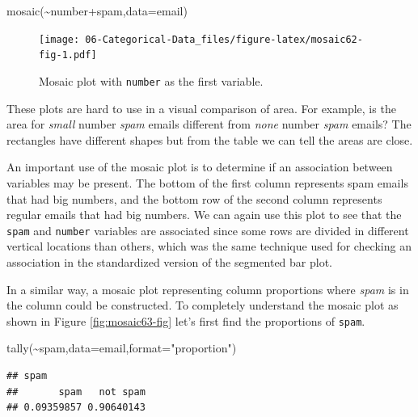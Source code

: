 \documentclass[
]{book}
\newenvironment{Shaded}{\begin{snugshade}}{\end{snugshade}}
\newcommand{\AttributeTok}[1]{\textcolor[rgb]{0.77,0.63,0.00}{#1}}
\newcommand{\FunctionTok}[1]{\textcolor[rgb]{0.00,0.00,0.00}{#1}}
\newcommand{\NormalTok}[1]{#1}
\newcommand{\SpecialCharTok}[1]{\textcolor[rgb]{0.00,0.00,0.00}{#1}}
\newcommand{\StringTok}[1]{\textcolor[rgb]{0.31,0.60,0.02}{#1}}
\begin{document}
\begin{Shaded}
\begin{Highlighting}[]
\FunctionTok{mosaic}\NormalTok{(}\SpecialCharTok{\textasciitilde{}}\NormalTok{number}\SpecialCharTok{+}\NormalTok{spam,}\AttributeTok{data=}\NormalTok{email)}
\end{Highlighting}
\end{Shaded}

\begin{figure}
\centering
\texttt{[image: 06-Categorical-Data\_files/figure-latex/mosaic62-fig-1.pdf]}
\caption{\label{fig:mosaic62-fig}Mosaic plot with \texttt{number} as the first variable.}
\end{figure}

These plots are hard to use in a visual comparison of area. For example, is the area for \emph{small} number \emph{spam} emails different from \emph{none} number \emph{spam} emails? The rectangles have different shapes but from the table we can tell the areas are close.

An important use of the mosaic plot is to determine if an association between variables may be present. The bottom of the first column represents spam emails that had big numbers, and the bottom row of the second column represents regular emails that had big numbers. We can again use this plot to see that the \texttt{spam} and \texttt{number} variables are associated since some rows are divided in different vertical locations than others, which was the same technique used for checking an association in the standardized version of the segmented bar plot.

In a similar way, a mosaic plot representing column proportions where \emph{spam} is in the column could be constructed. To completely understand the mosaic plot as shown in Figure \ref{fig:mosaic63-fig} let's first find the proportions of \texttt{spam}.

\begin{Shaded}
\begin{Highlighting}[]
\FunctionTok{tally}\NormalTok{(}\SpecialCharTok{\textasciitilde{}}\NormalTok{spam,}\AttributeTok{data=}\NormalTok{email,}\AttributeTok{format=}\StringTok{"proportion"}\NormalTok{)}
\end{Highlighting}
\end{Shaded}

\begin{verbatim}
## spam
##       spam   not spam 
## 0.09359857 0.90640143
\end{verbatim}
\end{document}
